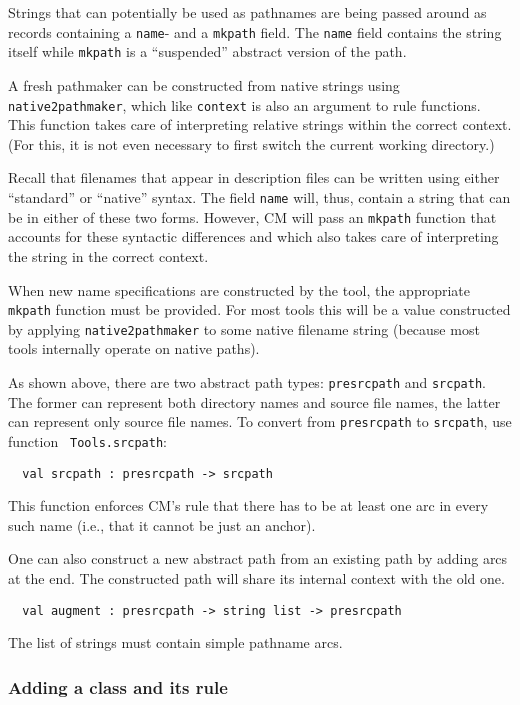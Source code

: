 Strings that can potentially be used as pathnames are being passed
around as records containing a {\tt name}- and a {\tt mkpath} field.
The {\tt name} field contains the string itself while {\tt mkpath}
is a ``suspended'' abstract version of the path.

A fresh pathmaker can be constructed from native strings using {\tt
native2pathmaker}, which like {\tt context} is also an argument to
rule functions.  This function takes care of interpreting relative
strings within the correct context.  (For this, it is not even
necessary to first switch the current working directory.)

Recall that filenames that appear in description files can be written
using either ``standard'' or ``native'' syntax.  The field {\tt name}
will, thus, contain a string that can be in either of these two forms.
However, CM will pass an {\tt mkpath} function that accounts for these
syntactic differences and which also takes care of interpreting the
string in the correct context.

When new name specifications are constructed by the tool, the
appropriate {\tt mkpath} function must be provided.  For most tools
this will be a value constructed by applying {\tt native2pathmaker} to
some native filename string (because most tools internally operate on
native paths).

As shown above, there are two abstract path types: {\tt presrcpath}
and {\tt srcpath}.  The former can represent both directory names and
source file names, the latter can represent only source file names.
To convert from {\tt presrcpath} to {\tt srcpath}, use function {\tt
Tools.srcpath}:
\begin{lstlisting}
  val srcpath : presrcpath -> srcpath
\end{lstlisting}%
This function enforces CM's rule that there has to be at least one arc
in every such name (i.e., that it cannot be just an anchor).

One can also construct a new abstract path from an existing path by
adding arcs at the end.  The constructed path will share its internal
context with the old one.

\begin{lstlisting}
  val augment : presrcpath -> string list -> presrcpath
\end{lstlisting}%

The list of strings must contain simple pathname arcs.

\subsubsection{Adding a class and its rule}


